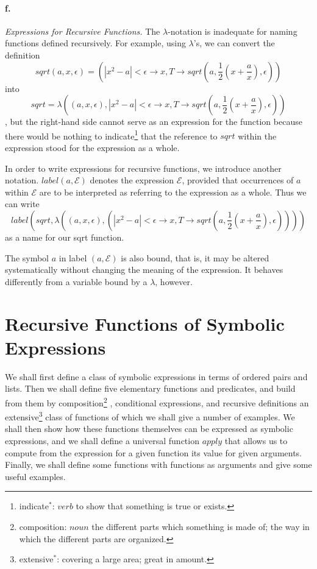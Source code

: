 \documentclass[11pt, a4paper]{article}
\begin{document}
\paragraph{f.}\textit{Expressions for Recursive Functions.}
The $\lambda$-notation is inadequate for naming functions defined
recursively. For example, using $\lambda$'s, we can convert the definition
$$ sqrt(a, x, \epsilon) =
(|x^2 - a| < \epsilon \to x,
T \to sqrt(a, \frac{1}{2}(x + \frac{a}{x}), \epsilon)) $$
into
$$ sqrt = \lambda((a, x, \epsilon),
|x^2 - a| < \epsilon \to x,
T \to sqrt(a, \frac{1}{2}(x + \frac{a}{x}), \epsilon)) $$
,
but the right-hand side cannot serve as an expression for the function because
there would be nothing to
indicate\footnote{indicate$^*$: $verb$ to show that something is true or
  exists.}
that the reference to $sqrt$ within the
expression stood for the expression as a whole.

In order to write expressions for recursive functions, we introduce another
notation. $label(a, \mathcal{E})$ denotes the expression $\mathcal{E}$, provided
that occurrences of $a$ within $\mathcal{E}$ are to be interpreted as referring
to the expression as a whole. Thus we can write
$$ label(sqrt, \lambda((a, x, \epsilon),
                       (|x^2 - a| < \epsilon \to x,
                       T \to sqrt(a, \frac{1}{2}(x + \frac{a}{x}), \epsilon))))
$$
as a name for our sqrt function.

The symbol $a$ in label $(a, \mathcal{E})$ is also bound, that is, it may be
altered systematically without changing the meaning of the expression. It
behaves differently from a variable bound by a $\lambda$, however.

\section{Recursive Functions of Symbolic Expressions}

We shall first define a class of symbolic expressions in terms of ordered pairs
and lists. Then we shall define five elementary functions and predicates, and
build from them by
composition\footnote{composition: $noun$ the different parts which something is
  made of; the way in which the different parts are organized.}
, conditional expressions, and recursive
definitions an
extensive\footnote{extensive$^*$: covering a large area; great in amount.}
class of functions of which we shall give a number of
examples. We shall then show how these functions themselves can be expressed as
symbolic expressions, and we shall define a universal function $apply$ that
allows us to compute from the expression for a given function its value for
given arguments. Finally, we shall define some functions with functions as
arguments and give some useful examples.
\end{document}
